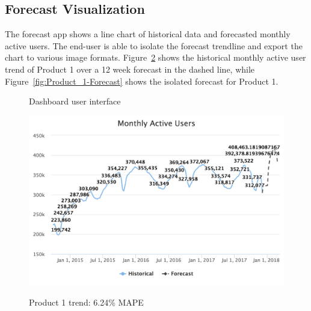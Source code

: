 \documentclass[11pt, oneside]{article}
\begin{document}
\subsection{Forecast Visualization}
The forecast app shows a line chart of historical data and forecasted monthly active users. The end-user is able to isolate the forecast trendline and export the chart to various image formats. Figure~\ref{fig:Product_1-Trend} shows the historical monthly active user trend of Product 1 over a 12 week forecast in the dashed line, while Figure~\ref{fig:Product_1-Forecast} shows the isolated forecast for Product 1.

\begin{figure}[h]
  \caption{Dashboard user interface}
  \centering
  \label{fig:Dashboard}
\end{figure}

\begin{figure}[h]
  \caption{Product 1 trend: 6.24\% MAPE}
  \centering
  \includegraphics[width=12.5cm]{images/Product_1-Trend-6_24_Percent_MAPE.png}
  \label{fig:Product_1-Trend}
\end{figure}
\end{document}
